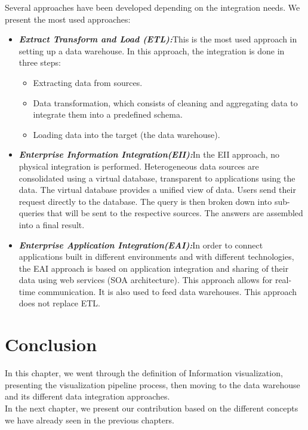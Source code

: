 Several approaches have been developed depending on the integration needs. We present the most used approaches\cite{naitEntropot}:
\begin{itemize}
  \item \textbf{\textit{Extract Transform and Load (ETL):}}\newline This is the most used approach in setting up a data warehouse. In this approach, the integration is done in three steps:
\begin{itemize}
\item Extracting data from sources.
\item Data transformation, which consists of cleaning and aggregating data to integrate them into a predefined schema.
\item Loading data into the target (the data warehouse).
\end{itemize}

  \item \textbf{\textit{Enterprise Information Integration(EII):}}\newline In the EII approach, no physical integration is performed. Heterogeneous data sources are consolidated using a virtual database, transparent to applications using the data. The virtual database provides a unified view of data. Users send their request directly to the database. The query is then broken down into sub-queries that will be sent to the respective sources. The answers are assembled into a final result.
  \item \textbf{\textit{Enterprise Application Integration(EAI):}}\newline In order to connect applications built in different environments and with different technologies, the EAI approach is based on application integration and sharing of their data using web services (SOA architecture). This approach allows for real-time communication.
It is also used to feed data warehouses. This approach does not replace ETL.
\end{itemize}



\section{Conclusion}
In this chapter, we went through the definition of Information visualization, presenting the visualization pipeline process, then moving to the data warehouse and its different data integration approaches.\\
In the next chapter, we present our contribution based on the different concepts we have already seen in the previous chapters.
